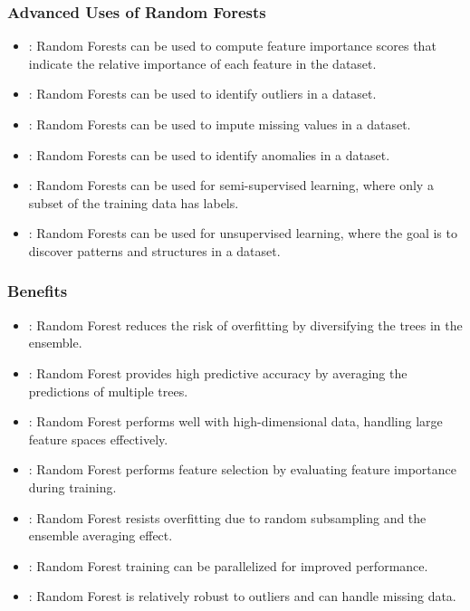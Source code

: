 \documentclass[11pt,aspectratio=1610,usenames,dvipsnames]{beamer} %
\begin{document}
\begin{frame}
	\frametitle{Advanced Uses of Random Forests}
	\begin{itemize}
		\item {}: Random Forests can be used to compute feature importance scores that indicate the relative importance of each feature in the dataset.
		\item {}: Random Forests can be used to identify outliers in a dataset.
		\item {}: Random Forests can be used to impute missing values in a dataset.
		\item {}: Random Forests can be used to identify anomalies in a dataset.
		\item {}: Random Forests can be used for semi-supervised learning, where only a subset of the training data has labels.
		\item {}: Random Forests can be used for unsupervised learning, where the goal is to discover patterns and structures in a dataset.
	\end{itemize}
	
\end{frame}

\begin{frame}[allowframebreaks]
	\frametitle{Benefits}
	\begin{itemize}
		\item {}: Random Forest reduces the risk of overfitting by diversifying the trees in the ensemble.
		\item {}: Random Forest provides high predictive accuracy by averaging the predictions of multiple trees.
		\item {}: Random Forest performs well with high-dimensional data, handling large feature spaces effectively.
		\item {}: Random Forest performs feature selection by evaluating feature importance during training.
		\item {}: Random Forest resists overfitting due to random subsampling and the ensemble averaging effect.
		\item {}: Random Forest training can be parallelized for improved performance.
		\item {}: Random Forest is relatively robust to outliers and can handle missing data.
		\end{itemize}
	

\end{frame}
\end{document}
